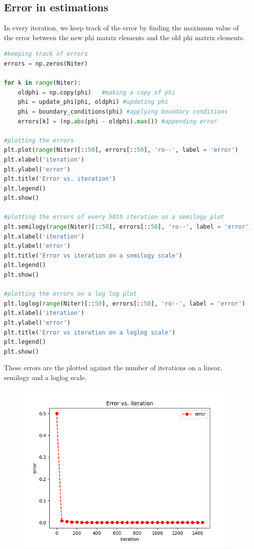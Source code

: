 \documentclass[11pt, a4paper]{article}
\begin{document}
\subsection{Error in estimations}
In every iteration, we keep track of the error by finding the maximum value of the error between the new phi matrix elements and the old phi matrix elements. 
\\
\begin{lstlisting}[language = Python]
#keeping track of errors
errors = np.zeros(Niter)

for k in range(Niter):
    oldphi = np.copy(phi)   #making a copy of phi
    phi = update_phi(phi, oldphi) #updating phi
    phi = boundary_conditions(phi) #applying boundary conditions
    errors[k] = (np.abs(phi - oldphi).max()) #appending error

#plotting the errors
plt.plot(range(Niter)[::50], errors[::50], 'ro--', label = 'error')
plt.xlabel('iteration')
plt.ylabel('error')
plt.title('Error vs. iteration')
plt.legend()
plt.show()

#plotting the errors of every 50th iteration on a semilogy plot
plt.semilogy(range(Niter)[::50], errors[::50], 'ro--', label = 'error')
plt.xlabel('iteration')
plt.ylabel('error')
plt.title('Error vs iteration on a semilogy scale')
plt.legend()
plt.show()

#plotting the errors on a log log plot
plt.loglog(range(Niter)[::50], errors[::50], 'ro--', label = 'error')
plt.xlabel('iteration')
plt.ylabel('error')
plt.title('Error vs iteration on a loglog scale')
plt.legend()
plt.show()


\end{lstlisting}

These errors are the plotted against the number of iterations on a linear, semilogy and a loglog scale.

\begin{figure}[H]
     \centering
     \includegraphics[scale=0.8]{Figure_2.png}
\end{figure}
\end{document}
